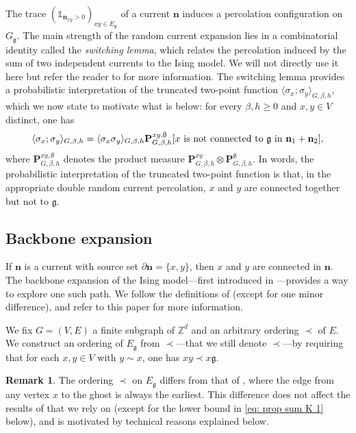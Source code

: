 \documentclass[11pt,a4paper]{article}
\numberwithin{equation}{section}
\theoremstyle{plain}
\theoremstyle{definition}
\newtheorem{Rem}[Thm]{Remark}
\newcommand\n{\mathbf{n}}
\newcommand\sn{\partial\mathbf{n}}
\newcommand\fg{\mathfrak{g}}
\begin{document}
The trace $(\mathds{1}_{\n_{xy}>0})_{xy \in E_\fg}$ of a current $\n$ induces a percolation configuration on $G_\fg$.   The main strength of the random current expansion lies in a combinatorial identity called the \emph{switching lemma}, which relates the percolation induced by the sum of two independent currents to the Ising model. We will not directly use it here but refer the reader to \cite{DuminilLecturesOnIsingandPottsModels2019,Panis2024applications} for more information. The switching lemma provides a probabilistic interpretation of the truncated two-point function $\langle \sigma_x;\sigma_y\rangle_{G,\beta,h}$, which we now state to motivate what is below: for every $\beta,h\geq 0$ and $x,y\in V$ distinct, one has
\begin{equation}\label{eq:switching for truncated}
	\langle \sigma_x;\sigma_y\rangle_{G,\beta,h}=\langle \sigma_x\sigma_y\rangle_{G,\beta,h}\mathbf P^{xy,\emptyset}_{G,\beta,h}[x \textup{ is not connected to }\fg\textup{ in }\n_1+\n_2],
\end{equation}
where $\mathbf P^{xy,\emptyset}_{G,\beta,h}$ denotes the product measure $\mathbf P^{xy}_{G,\beta,h}\otimes\mathbf P^{\emptyset}_{G,\beta,h}$. In words, the probabilistic interpretation of the truncated two-point function is that, in the appropriate double random current percolation, $x$ and $y$ are connected together but not to $\fg$.


\subsection{Backbone expansion}
If $\n$ is a current with source set $\sn=\{x,y\}$, then $x$ and $y$ are connected in $\n$. The backbone expansion of the Ising model---first introduced in \cite{AizenmanGeometricAnalysis1982}---provides a way to explore one such path.
We follow the definitions of \cite{AizenmanFernandezCriticalBehaviorMagnetization1986} (except for one minor difference), and refer to this paper for more information.

We fix $G=(V,E)$ a finite subgraph of $\mathbb Z^d$ and an arbitrary ordering $\prec$ of $E$. We construct an ordering of $E_\fg$ from $\prec$---that we still denote $\prec$---by requiring that for each $x,y\in V$ with $y\sim x$, one has $xy\prec x\fg$. 

\begin{Rem}
The ordering $\prec$ on $E_\fg$ differs from that of 
\cite{AizenmanFernandezCriticalBehaviorMagnetization1986}, where the edge 
from any vertex $x$ to the ghost is always the earliest. This difference 
does not affect the results of 
\cite{AizenmanFernandezCriticalBehaviorMagnetization1986} that we rely on (except for the lower bound in \eqref{eq: prop sum K 1} below), 
and is motivated by technical reasons explained below.
\end{Rem}
\end{document}
